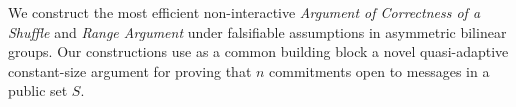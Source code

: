 %
We construct the most efficient non-interactive \emph{Argument of Correctness of a Shuffle} and \emph{Range Argument} under falsifiable assumptions in asymmetric bilinear groups.
Our constructions use as a common building block a novel quasi-adaptive constant-size argument for proving that $n$ commitments open to messages in a public set $S$.  
